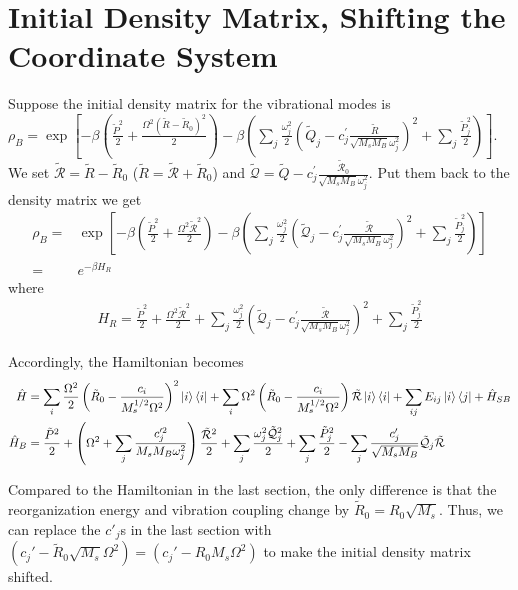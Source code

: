 \documentclass{article}
\begin{document}
\section*{Initial Density Matrix, Shifting the Coordinate System}
Suppose the initial density matrix for the vibrational modes is $\rho_B = \exp[-\beta (\frac{\tilde{P}^{2}}{2}
+ \frac{\Omega^{2}(\tilde{R}-\tilde{R}_0)^2}{2})-\beta(\sum_j \frac{\omega_{j}^{2}}{2} \left(\tilde{Q}_{j}-c^{\prime}_{j} \frac{\tilde{R}}{\sqrt{M_sM_{B}} \omega_{j}^{2}}\right)^{2} + \sum_j\frac{\tilde{P}_j^2}{2})]$. 
We set $\tilde{\mathcal{R}}=\tilde{R}-\tilde{R}_0$ ($\tilde{R}=\tilde{\mathcal{R}}+\tilde{R}_0$) and $\tilde{\mathcal{Q}}=\tilde{Q}-c^{\prime}_{j} \frac{\tilde{\mathcal{R}}_0}{\sqrt{M_sM_{B}} \omega_{j}^{2}}
$.
Put them back to the density matrix we get
\begin{align*}
	\rho_B =& \exp[-\beta (\frac{\tilde{P}^{2}}{2}
	+ \frac{\Omega^{2}\tilde{\mathcal{R}}^2}{2})-\beta(\sum_j \frac{\omega_{j}^{2}}{2} \left(\mathcal{\tilde{Q}}_{j}-c^{\prime}_{j} \frac{\tilde{\mathcal{R}}}{\sqrt{M_sM_{B}} \omega_{j}^{2}}\right)^{2} + \sum_j\frac{\tilde{P}_j^2}{2})]\\
	=&e^{-\beta H_R}
\end{align*}
where 
\begin{align*}
	H_R = \frac{\tilde{P}^{2}}{2}
	+ \frac{\Omega^{2}\tilde{\mathcal{R}}^2}{2}+\sum_j \frac{\omega_{j}^{2}}{2} \left(\mathcal{\tilde{Q}}_{j}-c^{\prime}_{j} \frac{\tilde{\mathcal{R}}}{\sqrt{M_sM_{B}} \omega_{j}^{2}}\right)^{2} + \sum_j\frac{\tilde{P}_j^2}{2}
\end{align*}

Accordingly, the Hamiltonian becomes
\begin{align*}
	\hat{H} &= 
	\sum_i\frac{\Omega^2}{2}\left(\tilde{R}_0-\frac{c_{i}}{M_{s}^{1/2} \Omega^{2}}\right)^2\ket{i}\bra{i}
	+\sum_{i} \Omega^{2} \left(\tilde{R}_0-\frac{c_{i}}{M_{s}^{1/2} \Omega^{2}}\right)\tilde{\mathcal{R}}\ket{i}\bra{i}
	+\sum_{ij}E_{ij}\ket{i}\bra{j}+\hat{H}_{S B}\\
	\hat{H}_{B} &= 
	\frac{\tilde{P}^{2}}{2}
	+ \left( \Omega^{2}+\sum_j \frac{ c'^ 2_{j}}{M_sM_B \omega_{j}^{2}}\right)\frac{\tilde{\mathcal{R}}^2}{2}
	+ \sum_j \frac{\omega_{j}^{2}\tilde{\mathcal{Q}}_j^2}{2}
	+ \sum_j\frac{\tilde{P}_j^2}{2}
	- \sum_j  \frac{c^{\prime}_{j}}{\sqrt{M_sM_B}} \tilde{\mathcal{Q}}_{j}\tilde{\mathcal{R}}
\end{align*}

Compared to the Hamiltonian in the last section, the only difference is that the reorganization energy and vibration coupling change by $\tilde{R}_0=R_0\sqrt{M_s}$. Thus, we can replace the $c'_j$s in the last section with $(c_j'-\tilde{R}_0\sqrt{M_s}\Omega^2)=(c_j'-R_0M_s\Omega^2)$ to make the initial density matrix shifted.
\end{document}
